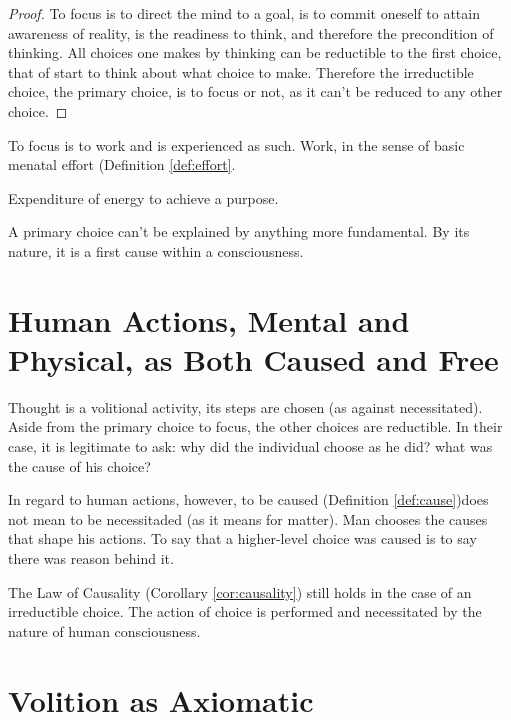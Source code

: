             \begin{proof}
                To focus is to direct the mind to a goal, is to commit oneself to attain awareness of reality, is the readiness to think, and therefore the precondition of thinking. All choices one makes by thinking can be reductible to the first choice, that of start to think about what choice to make. Therefore the irreductible choice, the primary choice, is to focus or not, as it can't be reduced to any other choice.
            \end{proof}

        To focus is to work and is experienced as such. Work, in the sense of basic menatal effort (Definition \ref{def:effort}.

            \begin{definition}[Effort]
            \label{def:effort}
                Expenditure of energy to achieve a purpose.
            \end{definition}

        A primary choice can't be explained by anything more fundamental. By its nature, it is a first cause within a consciousness.

    \section{Human Actions, Mental and Physical, as Both Caused and Free}
    
        Thought is a volitional activity, its steps are chosen (as against necessitated). Aside from the primary choice to focus, the other choices are reductible. In their case, it is legitimate to ask: why did the individual choose as he did? what was the cause of his choice?

        In regard to human actions, however, to be caused (Definition \ref{def:cause})does not mean to be necessitaded (as it means for matter). Man chooses the causes that shape his actions. To say that a higher-level choice was caused is to say there was reason behind it.

        The Law of Causality (Corollary \ref{cor:causality}) still holds in the case of an irreductible choice. The action of choice is performed and necessitated by the nature of human consciousness.


    \section{Volition as Axiomatic}

